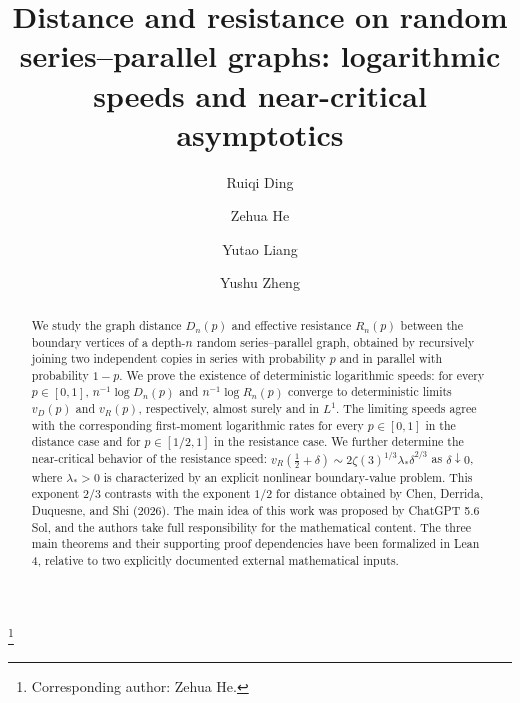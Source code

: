\documentclass[12pt]{amsart}
\numberwithin{equation}{section}
\theoremstyle{plain}
\theoremstyle{definition}
\begin{document}
\title[Distance and resistance on random series--parallel graphs]{Distance and resistance on random series--parallel graphs:
logarithmic speeds and near-critical asymptotics}
\author[Ding et~al.]{Ruiqi Ding}
\address{State Key Laboratory of Mathematical Sciences, Academy of Mathematics and
Systems Science, Chinese Academy of Sciences, Beijing 100190, China; School of
Mathematical Sciences, University of Chinese Academy of Sciences, Beijing 100049, China}
\author[]{Zehua He}
\address{State Key Laboratory of Mathematical Sciences, Academy of Mathematics and
Systems Science, Chinese Academy of Sciences, Beijing 100190, China; School of
Mathematical Sciences, University of Chinese Academy of Sciences, Beijing 100049, China}
\thanks{Corresponding author: Zehua He.}
\author[]{Yutao Liang}
\address{State Key Laboratory of Mathematical Sciences, Academy of Mathematics and
Systems Science, Chinese Academy of Sciences, Beijing 100190, China; School of
Mathematical Sciences, University of Chinese Academy of Sciences, Beijing 100049, China}
\author[]{Yushu Zheng}
\address{School of Mathematics, Shanghai University of Finance and Economics,
Shanghai 200433, China}
\begin{abstract}
We study the graph distance $D_n(p)$ and effective resistance
$R_n(p)$ between the boundary vertices of a depth-$n$ random series--parallel
graph, obtained by recursively joining two independent copies in series with
probability $p$ and in parallel with probability $1-p$. We prove the
existence of deterministic logarithmic speeds: for every $p\in[0,1]$,
$n^{-1}\log D_n(p)$ and $n^{-1}\log R_n(p)$ converge to deterministic limits
$v_D(p)$ and $v_R(p)$, respectively, almost surely and in $L^1$. The
limiting speeds agree with the corresponding first-moment logarithmic rates
for every $p\in[0,1]$ in the distance case and for $p\in[1/2,1]$ in the
resistance case.
We further determine the near-critical behavior of the resistance speed:
$v_R(\frac12+\delta)\sim
2\zeta(3)^{1/3}\lambda_*\delta^{2/3}$ as $\delta\downarrow0$, where
$\lambda_*>0$ is characterized by an explicit nonlinear boundary-value
problem. This exponent $2/3$ contrasts with the exponent $1/2$ for distance
obtained by Chen, Derrida, Duquesne, and Shi (2026).  The main idea of this work was proposed by ChatGPT 5.6 Sol, and the authors take full responsibility for the mathematical content. The three main theorems and their supporting proof dependencies have been formalized in Lean 4, relative to two explicitly documented external mathematical inputs.
\end{abstract}
\end{document}
